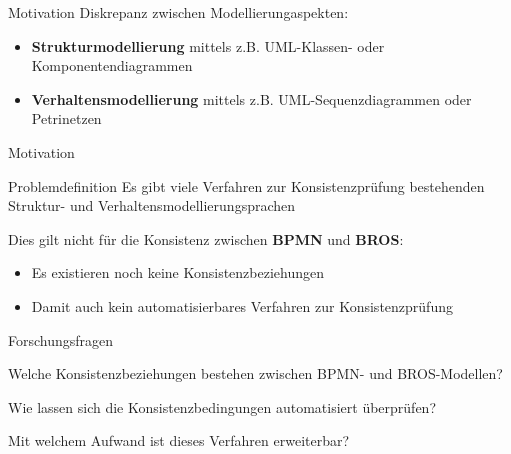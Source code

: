 \begin{frame}{Motivation}
  Diskrepanz zwischen Modellierungaspekten:

  \begin{itemize}
    \item \textbf{Strukturmodellierung} mittels z.B. UML-Klassen- oder Komponentendiagrammen 

    \item \textbf{Verhaltensmodellierung} mittels z.B. UML-Sequenzdiagrammen oder Petrinetzen
  \end{itemize}
\end{frame}
\begin{frame}{Motivation}
  
\end{frame}

\begin{frame}{Problemdefinition}
  Es gibt viele Verfahren zur Konsistenzprüfung bestehenden Struktur- und Verhaltensmodellierungsprachen

  Dies gilt nicht für die Konsistenz zwischen \textbf{BPMN} und \textbf{BROS}:

  \begin{itemize}
    \item Es existieren noch keine Konsistenzbeziehungen

    \item Damit auch kein automatisierbares Verfahren zur Konsistenzprüfung
  \end{itemize}
\end{frame}

\begin{frame}{Forschungsfragen}
  \begin{description}[4cm]
    \item[F1] Welche Konsistenzbeziehungen bestehen zwischen BPMN- und BROS-Modellen?

    \item[F2] Wie lassen sich die Konsistenzbedingungen automatisiert überprüfen?

    \item[F3] Mit welchem Aufwand ist dieses Verfahren erweiterbar?
  \end{description}
\end{frame}
